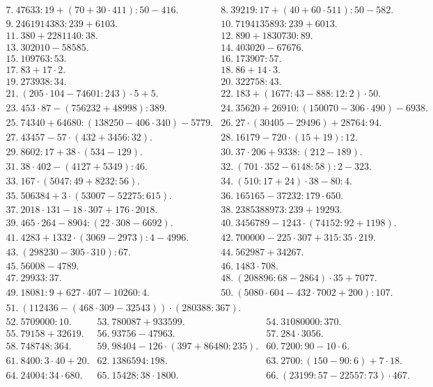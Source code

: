 \documentclass[12pt]{article}
\begin{document}
$\begin{array}{lll}
7.\ 47633:19+(70+30\cdot 411):50-416.&
8.\  39219:17+(40+60\cdot 511):50-582.\\
9.\  2461914383:239+6103.&
10.\  7194135893:239+6013.\\
11.\  380+2281140:38.&
12.\  890+1830730:89.\\
13.\  302010-58585.&
14.\  403020-67676.\\
15.\  109763:53.&
16.\  173907:57.\\
17.\  83+17\cdot 2.&
18.\ 86+14\cdot 3.\\
19.\ 273938:34.&
20.\ 322758:43.\\
21.\ (205\cdot104-74601:243)\cdot5+5.&
22.\ 183+(1677:43-888:12:2)\cdot50.\\
23.\ 453\cdot87-(756232+48998):389.&
24.\ 35620+26910:(150070-306\cdot490)-6938.\\
25.\ 74340+64680:(138250-406\cdot340)-5779.&
26.\ 27\cdot(30405-29496)+28764:94.\\
27.\ 43457-57\cdot(432+3456:32).&
28.\ 16179-720\cdot(15+19):12.\\
29.\ 8602:17+38\cdot(534-129).&
30.\ 37\cdot206+9338:(212-189).\\
31.\ 38\cdot402-(4127+5349):46.&
32.\ (701\cdot352-6148:58):2-323.\\
33.\ 167\cdot(5047:49+8232:56).&
34.\ (510:17+24)\cdot38-80:4.\\
35.\ 506384+3\cdot(53007-52275:615).&
36.\ 165165-37232:179\cdot650.\\
37.\ 2018\cdot131-18\cdot307+176\cdot2018.&
38.\ 2385388973:239+19293.\\
39.\ 465\cdot264-8904:(22\cdot308-6692).&
40.\  3456789-1243\cdot(74152:92+1198).\\
41.\  4283+1332\cdot(3069-2973):4-4996.&
42.\  700000-225\cdot307+315:35\cdot219.\\
43.\  (298230-305\cdot310):67.&
44.\ 562987+34267.\\
45.\ 56008-4789.&
46.\ 1483\cdot708.\\
47.\ 29933:37.&
48.\ (208896:68-2864)\cdot35+7077.\\
49.\  18081:9+627\cdot407-10260:4.&
50.\  (5080\cdot604-432\cdot7002+200):107.\end{array}$\\$\begin{array}{lll}
51.\ (112436-(468\cdot309-32543))\cdot(280388:367).\end{array}$\\
$\begin{array}{lll}
52.\ 5709000:10.&
53.\ 780087+933599.&
54.\ 31080000:370.\\
55.\ 79158+32619.&
56.\ 93756-47963.&
57.\ 284\cdot3056.\\
58.\ 748748:364.&
59.\  98404-126\cdot(397+86480:235).&
60.\ 7200:90-10\cdot6.\\
61.\ 8400:3\cdot40+20.&
62.\ 1386594:198.&
63.\ 2700:(150-90:6)+7\cdot18.\\
64.\ 24004:34\cdot680.&
65.\ 15428:38\cdot1800.&
66.\ (23199:57-22557:73)\cdot467.\end{array}$\\
\end{document}
